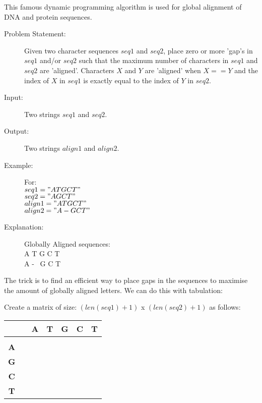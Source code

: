 This famous dynamic programming algorithm is used for global alignment of DNA and protein sequences.

\begin{description}
    
    \item[Problem Statement:]
        Given two character sequences $seq1$ and $seq2$,
        place zero or more 'gap's in $seq1$ and/or $seq2$ such that the maximum number of characters in $seq1$ and $seq2$ are 'aligned'.
        Characters $X$ and $Y$ are 'aligned' when $X == Y$ and the index of $X$ in $seq1$ is exactly equal to the index of $Y$ in $seq2$.
        
    \item[Input:] 
        Two strings $seq1$ and $seq2$.
        
    \item[Output:]
        Two strings $align1$ and $align2$.
        
    \item[Example:] For:\\
        $seq1 = "ATGCT"$\\
        $seq2 = "AGCT"$\\
        $align1 = "ATGCT"$\\
        $align2 = "A-GCT"$

    \item[Explanation:]
        Globally Aligned sequences:\\
        A T G C T\\
        A - \ G C T
\end{description}

The trick is to find an efficient way to place gaps in the sequences to maximise the amount of globally aligned letters.
We can do this with tabulation:

Create a matrix of size: $(len(seq1) + 1)$ x $(len(seq2) + 1)$ as follows:

\begin{table}[htbp]
    \centering
    \begin{tabular}{|c|c|c|c|c|c|c|}
        \hline
          &  & \textbf{A} & \textbf{T} & \textbf{G} & \textbf{C} & \textbf{T} \\
        \hline
         &  &  &  &  &  &  \\
        \hline
        \textbf{A} &  &  &  &  &  &  \\
        \hline
        \textbf{G} &  &  &  &  &  &  \\
        \hline
        \textbf{C} &  &  &  &  &  &  \\
        \hline
        \textbf{T} &  &  &  &  &  &  \\
        \hline
    \end{tabular}
\end{table}


